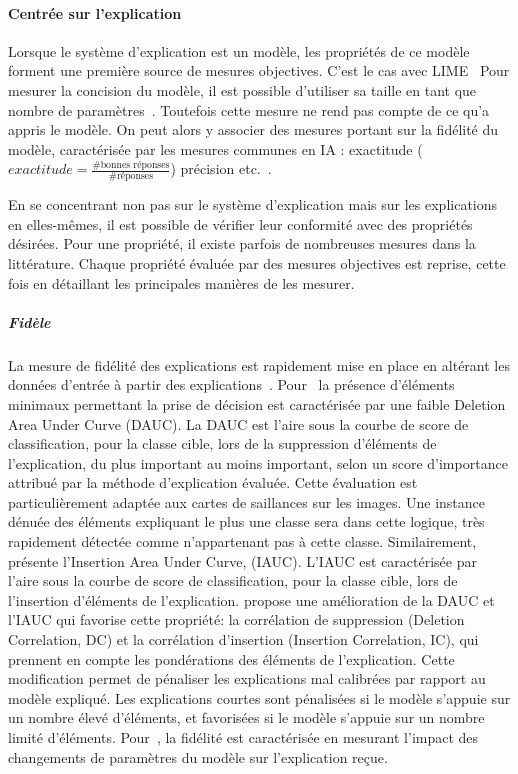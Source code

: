\paragraph{Centrée sur l'explication}

Lorsque le système d'explication est un modèle, les propriétés de ce modèle forment une première source de mesures objectives. C'est le cas avec LIME~\cite{Ribeiro2016}
Pour mesurer la concision du modèle, il est possible d'utiliser sa taille en tant que nombre de paramètres~\cite{Guidotti2018}.
Toutefois cette mesure ne rend pas compte de ce qu'a appris le modèle. On peut alors y associer des mesures portant sur la fidélité du modèle, caractérisée par les mesures communes en IA : exactitude ($exactitude = \frac{\#\textrm{bonnes réponses}}{\#\textrm{réponses}} $) précision etc.~\cite{Lundberg2017,Lakkaraju2019,Ribeiro2018,Hoffman2018,Liu2021}.

En se concentrant non pas sur le système d'explication mais sur les explications en elles-mêmes, il est possible de vérifier leur conformité avec des propriétés désirées. Pour une propriété, il existe parfois de nombreuses mesures dans la littérature. Chaque propriété évaluée par des mesures objectives est reprise, cette fois en détaillant les principales manières de les mesurer.

\subparagraph{Fidèle}
La mesure de fidélité des explications est rapidement mise en place en altérant les données d'entrée à partir des explications~\cite{Samek2016,Samek2017,Montavon2018,Schlegel2019}.
Pour~\cite{Petsiuk2018} la présence d'éléments minimaux permettant la prise de décision est caractérisée par une faible Deletion Area Under Curve (DAUC). La DAUC est l'aire sous la courbe de score de classification, pour la classe cible, lors de la suppression d'éléments de l'explication, du plus important au moins important, selon un score d'importance attribué par la méthode d'explication évaluée. Cette évaluation est particulièrement adaptée aux cartes de saillances sur les images. Une instance dénuée des éléments expliquant le plus une classe sera dans cette logique, très rapidement détectée comme n'appartenant pas à cette classe. Similairement,~\cite{Petsiuk2018} présente l'Insertion Area Under Curve, (IAUC). L'IAUC est caractérisée par l'aire sous la courbe de score de classification, pour la classe cible, lors de l'insertion d'éléments de l'explication.
\cite{Gomez2022} propose une amélioration de la DAUC et l'IAUC qui favorise cette propriété: la corrélation de suppression (Deletion Correlation, DC) et la corrélation d'insertion (Insertion Correlation, IC), qui prennent en compte les pondérations des éléments de l'explication. Cette modification permet de pénaliser les explications mal calibrées par rapport au modèle expliqué. Les explications courtes sont pénalisées si le modèle s'appuie sur un nombre élevé d'éléments, et favorisées si le modèle s'appuie sur un nombre limité d'éléments.
Pour~\cite{Adebayo2018}, la fidélité est caractérisée en mesurant l'impact des changements de paramètres du modèle sur l'explication reçue.

